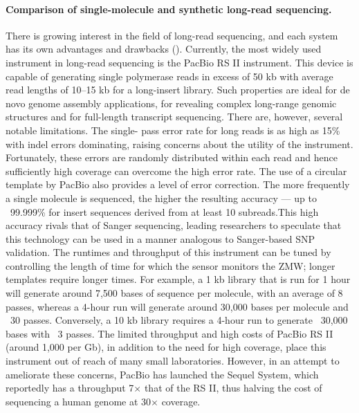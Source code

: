 \paragraph{Comparison of single-molecule and synthetic long-read sequencing.}
There is growing interest in the field of long-read sequencing, and each system has its own advantages and drawbacks ().
Currently, the most widely used instrument in long-read sequencing is the PacBio RS II instrument. This device is capable of generating single 
polymerase reads in excess of 50 kb with average read lengths of 10–15 kb for a long-insert library. Such properties are ideal for 
de novo genome assembly applications, for revealing complex long-range genomic structures and for full-length transcript sequencing. There are, however, several notable limitations. The 
single- pass error rate for long reads is as high as 15\% with indel errors dominating, raising concerns about the utility of the instrument. Fortunately, these 
errors are randomly distributed within each read and hence sufficiently high coverage can overcome the high error rate. The use of a circular template by PacBio also 
provides a level of error correction. The more frequently a single molecule is sequenced, the higher the resulting accuracy — up to ~99.999\% for insert sequences 
derived from at least 10 subreads.This high accuracy rivals that of Sanger sequencing, leading researchers to speculate that this technology can be used in a manner analogous to Sanger-based SNP validation. The 
runtimes and throughput of this instrument can be tuned by controlling the length of time for which the sensor monitors the ZMW; longer templates require longer times. For example, a 1 kb library that is run for 
1 hour will generate around 7,500 bases of sequence per molecule, with an average of 8 passes, whereas a 4-hour run will generate around 30,000 bases per molecule 
and ~30 passes. Conversely, a 10 kb library requires a 4-hour run to generate ~30,000 bases with ~3 passes. The limited throughput and high costs of PacBio RS II 
(around 1,000 per Gb), in addition to the need for high coverage, place this instrument out of reach of many small laboratories. However, in an attempt to ameliorate 
these concerns, PacBio has launched the Sequel System, which reportedly has a throughput 7$\times$ that of the RS II, thus halving the cost of sequencing a human genome at 30$\times$ coverage.


